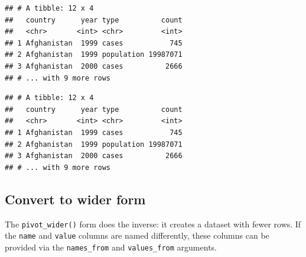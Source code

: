 \documentclass[]{book}
\newenvironment{Shaded}{}{}
\newcommand{\DataTypeTok}[1]{#1}
\newcommand{\KeywordTok}[1]{\textcolor[rgb]{0.00,0.00,1.00}{#1}}
\newcommand{\NormalTok}[1]{#1}
\newcommand{\OperatorTok}[1]{#1}
\newcommand{\StringTok}[1]{\textcolor[rgb]{0.00,0.50,0.50}{#1}}
\begin{document}
\begin{Shaded}
\end{Shaded}

\begin{verbatim}
## # A tibble: 12 x 4
##   country      year type          count
##   <chr>       <int> <chr>         <int>
## 1 Afghanistan  1999 cases           745
## 2 Afghanistan  1999 population 19987071
## 3 Afghanistan  2000 cases          2666
## # ... with 9 more rows
\end{verbatim}

\begin{Shaded}
\end{Shaded}

\begin{verbatim}
## # A tibble: 12 x 4
##   country      year type          count
##   <chr>       <int> <chr>         <int>
## 1 Afghanistan  1999 cases           745
## 2 Afghanistan  1999 population 19987071
## 3 Afghanistan  2000 cases          2666
## # ... with 9 more rows
\end{verbatim}

\hypertarget{convert-to-wider-form}{%
\subsection{Convert to wider form}\label{convert-to-wider-form}}

The \texttt{pivot\_wider()} form does the inverse: it creates a dataset with fewer rows.
If the \texttt{name} and \texttt{value} columns are named differently, these columns can be provided via the \texttt{names\_from} and \texttt{values\_from} arguments.
\end{document}
